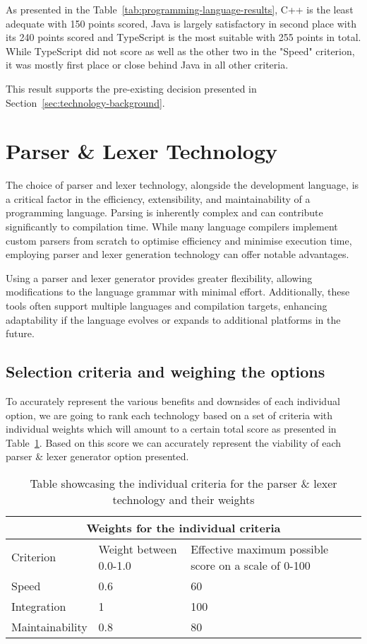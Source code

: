As presented in the Table~\ref{tab:programming-language-results}, C++ is the least adequate with 150 points scored, Java is largely satisfactory in second place with its 240 points scored and TypeScript is the most suitable with 255 points in total. While TypeScript did not score as well as the other two in the "Speed" criterion, it was mostly first place or close behind Java in all other criteria.

This result supports the pre-existing decision presented in Section~\ref{sec:technology-background}.

\section{Parser \& Lexer Technology}

The choice of parser and lexer technology, alongside the development language, is a critical factor in the efficiency, extensibility, and maintainability of a programming language. Parsing is inherently complex and can contribute significantly to compilation time. While many language compilers implement custom parsers from scratch to optimise efficiency and minimise execution time, employing parser and lexer generation technology can offer notable advantages.

Using a parser and lexer generator provides greater flexibility, allowing modifications to the language grammar with minimal effort. Additionally, these tools often support multiple languages and compilation targets, enhancing adaptability if the language evolves or expands to additional platforms in the future.

\subsection{Selection criteria and weighing the options}
\label{sec:parser-and-lexer-technology-selection-criteria}

To accurately represent the various benefits and downsides of each individual option, we are going to rank each technology based on a set of criteria with individual weights which will amount to a certain total score as presented in Table~\ref{tab:parser-and-lexer-technology-selection-criteria}. Based on this score we can accurately represent the viability of each parser \& lexer generator option presented.

\begin{table}[H]
	\centering
	\begin{tabular}{ |p{4cm}|p{5cm}|p{5cm}|  }
		\hline
		\multicolumn{3}{|c|}{Weights for the individual criteria} \\
		\hline
		Criterion&Weight between 0.0-1.0&Effective maximum possible score on a scale of 0-100\\
		\hline
		Speed&0.6&60\\
		Integration&1&100\\
		Maintainability&0.8&80\\
		\hline
	\end{tabular}
	\caption{Table showcasing the individual criteria for the parser \& lexer technology and their weights}
	\label{tab:parser-and-lexer-technology-selection-criteria}
\end{table}

